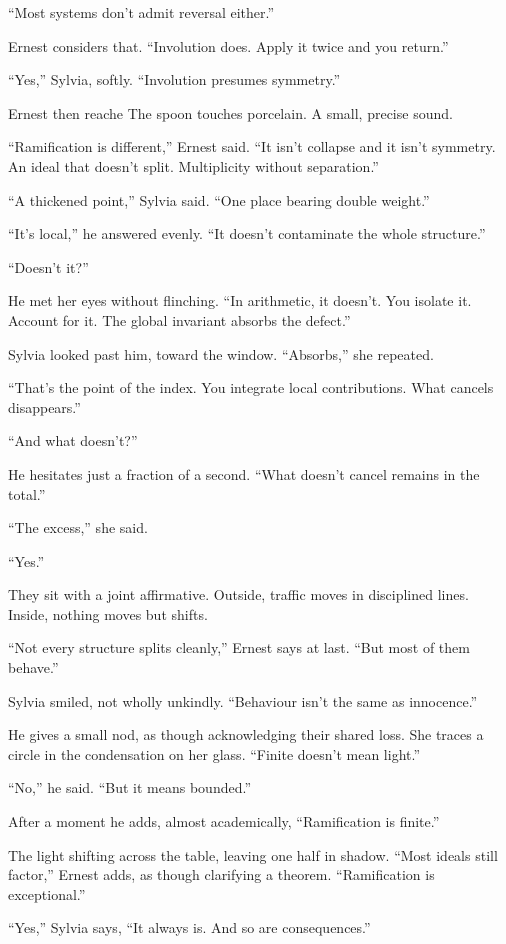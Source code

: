 “Most systems don’t admit reversal either.”

Ernest considers that. “Involution does. Apply it twice and you return.”

“Yes,” Sylvia, softly. “Involution presumes symmetry.”

Ernest then reache
The spoon touches porcelain. A small, precise sound.

“Ramification is different,” Ernest said.
“It isn’t collapse and it isn’t symmetry.
An ideal that doesn’t split.
Multiplicity without separation.”

“A thickened point,” Sylvia said.
“One place bearing double weight.”

“It’s local,” he answered evenly.
“It doesn’t contaminate the whole structure.”

“Doesn’t it?”

He met her eyes without flinching.
“In arithmetic, it doesn’t.
You isolate it. Account for it.
The global invariant absorbs the defect.”

Sylvia looked past him, toward the window.
“Absorbs,” she repeated.

“That’s the point of the index.
You integrate local contributions.
What cancels disappears.”

“And what doesn’t?”

He hesitates just a fraction of a second.
“What doesn’t cancel remains in the total.”

“The excess,” she said.

“Yes.”

They sit with a joint affirmative. Outside, traffic moves in disciplined lines. Inside, nothing moves but shifts.

“Not every structure splits cleanly,” Ernest says at last.
“But most of them behave.”

Sylvia smiled, not wholly unkindly.
“Behaviour isn’t the same as innocence.”

He gives a small nod, as though acknowledging their shared loss. She traces a circle in the condensation on her glass.
“Finite doesn’t mean light.”

“No,” he said.
“But it means bounded.”

After a moment he adds, almost academically,
“Ramification is finite.”

The light shifting across the table, leaving one half in shadow.
“Most ideals still factor,” Ernest adds,
as though clarifying a theorem. “Ramification is exceptional.”

“Yes,” Sylvia says, “It always is. And so are consequences.”
